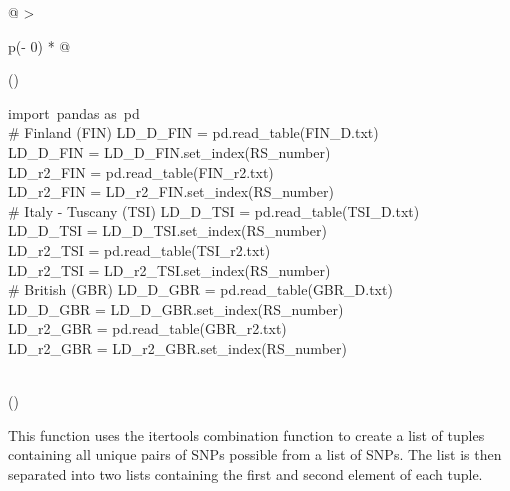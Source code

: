 \documentclass[12pt,a4paper]{article}
\begin{document}
\begin{longtable}[]{@{}
  >{\raggedright\arraybackslash}p{(\columnwidth - 0\tabcolsep) * }@{}}
\toprule()
\endhead
\begin{minipage}[t]{\linewidth}\raggedright
{import}{~pandas }{as}{~pd\\
}{\# Finland (FIN)}{\hfill\break
LD\_D\_FIN =
pd.read\_table(}{\textquotesingle FIN\_D.txt\textquotesingle{}}{)\\
LD\_D\_FIN =
LD\_D\_FIN.set\_index(}{\textquotesingle RS\_number\textquotesingle{}}{)\\
LD\_r2\_FIN =
pd.read\_table(}{\textquotesingle FIN\_r2.txt\textquotesingle{}}{)\\
LD\_r2\_FIN =
LD\_r2\_FIN.set\_index(}{\textquotesingle RS\_number\textquotesingle{}}{)\\
}{\# Italy - Tuscany (TSI)}{\hfill\break
LD\_D\_TSI =
pd.read\_table(}{\textquotesingle TSI\_D.txt\textquotesingle{}}{)\\
LD\_D\_TSI =
LD\_D\_TSI.set\_index(}{\textquotesingle RS\_number\textquotesingle{}}{)\\
LD\_r2\_TSI =
pd.read\_table(}{\textquotesingle TSI\_r2.txt\textquotesingle{}}{)\\
LD\_r2\_TSI =
LD\_r2\_TSI.set\_index(}{\textquotesingle RS\_number\textquotesingle{}}{)\\
}{\# British (GBR)}{\hfill\break
LD\_D\_GBR =
pd.read\_table(}{\textquotesingle GBR\_D.txt\textquotesingle{}}{)\\
LD\_D\_GBR =
LD\_D\_GBR.set\_index(}{\textquotesingle RS\_number\textquotesingle{}}{)\\
LD\_r2\_GBR =
pd.read\_table(}{\textquotesingle GBR\_r2.txt\textquotesingle{}}{)\\
LD\_r2\_GBR =
LD\_r2\_GBR.set\_index(}{\textquotesingle RS\_number\textquotesingle{}}{)}\strut
\end{minipage} \\
\bottomrule()
\end{longtable}

{}

{This function uses the itertools combination function to create a list
of tuples containing all unique pairs of SNPs possible from a list of
SNPs. The list is then separated into two lists containing the first and
second element of each tuple.}

\protect\hypertarget{t.3cd888f33c1969e34d6e88ae1b5769c14c614333}{}{}\protect\hypertarget{t.9}{}{}
\end{document}
